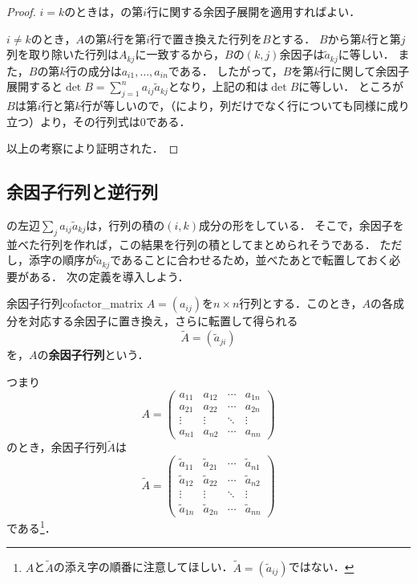 \begin{tleftbar}
\begin{proof}
  $i=k$のときは，の第$i$行に関する余因子展開を適用すればよい．

$i \ne k$のとき，$A$の第$k$行を第$i$行で置き換えた行列を$B$とする．
$B$から第$k$行と第$j$列を取り除いた行列は$A_{kj}$に一致するから，$B$の$(k, j)$余因子は$\tilde{a}_{kj}$に等しい．
また，$B$の第$k$行の成分は$a_{i1}, \dots, a_{in}$である．
したがって，$B$を第$k$行に関して余因子展開すると$\det B = \sum_{j=1}^{n} a_{ij}\tilde{a}_{kj}$となり，上記の和は$\det B$に等しい．
ところが$B$は第$i$行と第$k$行が等しいので，（により，列だけでなく行についても同様に成り立つ）より，その行列式は$0$である．

  以上の考察により証明された．
\end{proof}
\end{tleftbar}

\subsection{余因子行列と逆行列}

の左辺$\sum_j a_{ij}\tilde{a}_{kj}$は，行列の積の$(i, k)$成分の形をしている．
そこで，余因子を並べた行列を作れば，この結果を行列の積としてまとめられそうである．
ただし，添字の順序が$\tilde{a}_{kj}$であることに合わせるため，並べたあとで転置しておく必要がある．
次の定義を導入しよう．

\begin{definition}{余因子行列}{cofactor_matrix}
  $A = (a_{ij})$を$n \times n$行列とする．このとき，$A$の各成分を対応する余因子に置き換え，さらに転置して得られる
  \[
  \tilde{A} = (\tilde{a}_{ji})
  \]
  を，$A$の\textbf{余因子行列}という．

  つまり
  \[
   A = 
   \begin{pmatrix} 
    a_{11} & a_{12} & \cdots & a_{1n} \\
    a_{21} & a_{22} & \cdots & a_{2n} \\
    \vdots & \vdots & \ddots & \vdots \\
    a_{n1} & a_{n2} & \cdots & a_{nn}
   \end{pmatrix}
  \]
  のとき，余因子行列$\tilde{A}$は
  \[
    \tilde{A} =
    \begin{pmatrix}
    \tilde{a}_{11} & \tilde{a}_{21} & \cdots & \tilde{a}_{n1} \\
    \tilde{a}_{12} & \tilde{a}_{22} & \cdots & \tilde{a}_{n2} \\
    \vdots & \vdots & \ddots & \vdots \\
    \tilde{a}_{1n} & \tilde{a}_{2n} & \cdots & \tilde{a}_{nn}
    \end{pmatrix}
  \]
  である\footnote{$A$と$\tilde{A}$の添え字の順番に注意してほしい．$\tilde{A}=(\tilde{a}_{ij})$ではない．}．
\end{definition}

